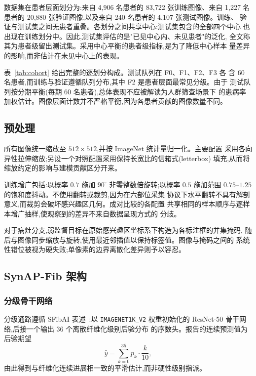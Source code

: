 数据集在患者层面划分为:来自 4,906 名患者的 83,722 张训练图像、来自 1,227
名患者的 20,880 张验证图像,以及来自 240 名患者的 4,107 张测试图像。训练、
验证与测试集之间无患者重叠。各划分之间共享中心:测试集包含的全部四个中心
也出现在训练划分中。因此,测试集评估的是"已见中心内、未见患者"的泛化,
全文称其为患者级留出测试集。采用中心平衡的患者级指标,是为了降低中心样本
量差异的影响,而非估计在未见中心上的表现。

表~\ref{tab:cohort} 给出完整的逐划分构成。测试队列在 F0、F1、F2、F3 各
含 60 名患者,而训练与验证遵循队列分布,其中 F2 是患者层面最常见分级。由于
测试队列按分期平衡(每期 60 名患者),总体表现不应被解读为人群筛查场景下
的患病率加权估计。图像层面计数并不严格平衡,因为各患者贡献的图像数量不同。

\subsection{预处理}

所有图像统一缩放至 $512\times512$,并按 ImageNet 统计量归一化。主要配置
采用各向异性拉伸缩放;另设一个对照配置采用保持长宽比的信箱式(letterbox)
填充,从而将缩放约定的影响与建模贡献区分开来。

训练增广包括:以概率 $0.7$ 施加 $90^\circ$ 非零整数倍旋转;以概率 $0.5$
施加范围 $0.75$--$1.25$ 的饱和度抖动。不使用翻转或裁剪,因为在六部位采集
协议下水平翻转不具有解剖意义,而裁剪会破坏感兴趣区几何。成对比较的各配置
共享相同的样本顺序与逐样本增广抽样,使观察到的差异不来自数据呈现方式的
分歧。

对于病灶分支,弱监督目标在原始感兴趣区坐标系下构造为各标注框的并集掩码,
随后与图像同步缩放与旋转,使用最近邻插值以保持标签值。图像与掩码之间的
系统性错位被视为硬失败;单像素的边界离散化差异则予以容忍。

\subsection{SynAP-Fib 架构}

\subsubsection{分级骨干网络}

分级通路遵循 SFibAI 表述~\cite{xu2026sfibai}:以 \texttt{IMAGENET1K\_V2}
权重初始化的 ResNet-50 骨干网络,后接一个输出 36 个离散纤维化级别后验分布
的序数头。报告的连续预测值为后验期望
\begin{equation}
\hat{y} = \sum_{k=0}^{35} p_k \cdot \frac{k}{10},
\label{eq:score}
\end{equation}
由此得到与纤维化连续进展相一致的平滑估计,而非硬性级别指派。

